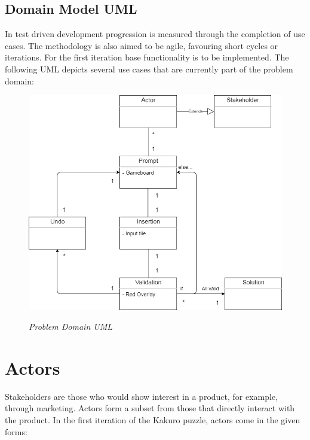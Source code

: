 \documentclass[12pt]{article}
\begin{document}
\newpage
\pagestyle{plain} 
\subsection{Domain Model UML}
In test driven development progression is measured through the completion of use cases. The methodology is also aimed to be agile, favouring short cycles or iterations. For the first iteration base functionality is to be implemented. The following UML depicts several use cases that are currently part of the problem domain:\\

\begin{figure}[htbp]
\centerline{\includegraphics[scale=.6]{TempUML.png}}
\centerline{\textit {Problem Domain UML}}
\end{figure}

\newpage
\pagestyle{plain} 
\section{Actors}

Stakeholders are those who would show interest in a product, for example, through marketing. Actors form a subset from those that directly interact with the product. In the first iteration of the Kakuro puzzle, actors come in the given forms:
\end{document}
